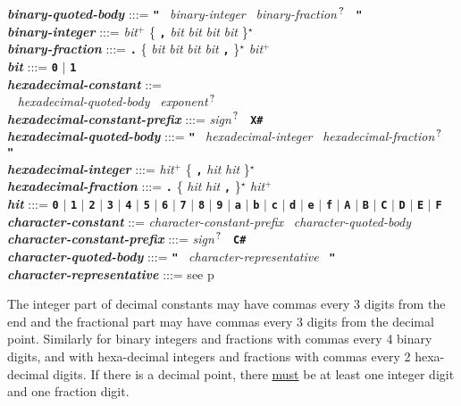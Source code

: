 \documentclass[12pt]{article}
\newcommand{\TT}[1]{{\tt \bfseries #1}}
\newcommand{\STAR}{{\Large $^\star$}}
\newcommand{\PLUS}[1][]{{$^{+#1}$}}
\newcommand{\QMARK}{{$^{\,\mbox{\footnotesize ?}}$}}
\newcommand{\emkey}[1]{{\em \bfseries #1}}
\newcommand{\pagref}[1]{p\pageref{#1}}
\newenvironment{indpar}[1][0.3in]%
	{\begin{list}{}%
		     {\setlength{\itemsep}{0in}%
		      \setlength{\topsep}{0in}%
		      \setlength{\parsep}{1ex}%
		      \setlength{\labelwidth}{#1}%
		      \setlength{\leftmargin}{#1}%
		      \addtolength{\leftmargin}{\labelsep}}%
	 \item}%
	{\end{list}}
\begin{document}
\begin{indpar}
\emkey{binary-quoted-body} :::= \TT{"}~ {\em binary-integer}~
				{\em binary-fraction}\QMARK{}~ \TT{"}
\\[0.5ex]
\emkey{binary-integer}
    :::= {\em bit}\PLUS{}
           \{ \TT{,} {\em bit} {\em bit} {\em bit} {\em bit} \}\STAR{} \\
\emkey{binary-fraction} :::=
    \TT{.} \{ {\em bit} {\em bit} {\em bit} {\em bit} \TT{,} \}\STAR{}
    {\em bit}\PLUS{} \\
\emkey{bit} :::= \TT{0} $|$ \TT{1}
 \\[0.5ex]
\emkey{hexadecimal-constant} ::= \\
\hspace*{0.5in}{\em hexadecimal-constant-prefix}~
               {\em hexadecimal-quoted-body}~
	       {\em exponent}\QMARK{}
\\[0.5ex]
\emkey{hexadecimal-constant-prefix} :::= {\em sign}\QMARK{}~ \TT{X\#}
\\[0.5ex]
\emkey{hexadecimal-quoted-body} :::= \TT{"}~ {\em hexadecimal-integer}~
				     {\em hexadecimal-fraction}\QMARK{}~ \TT{"}
\\[0.5ex]
\emkey{hexadecimal-integer}
    :::= {\em hit}\PLUS{}
           \{ \TT{,} {\em hit} {\em hit} \}\STAR{} \\
\emkey{hexadecimal-fraction} :::=
    \TT{.} \{ {\em hit} {\em hit} \TT{,} \}\STAR{}
    {\em hit}\PLUS{} \\
\emkey{hit} :::= \TT{0} $|$ \TT{1} $|$ \TT{2} $|$ \TT{3} $|$ \TT{4}
	     $|$ \TT{5} $|$ \TT{6} $|$ \TT{7} $|$ \TT{8} $|$ \TT{9}
	     $|$ \TT{a} $|$ \TT{b} $|$ \TT{c} $|$ \TT{d} $|$ \TT{e} $|$ \TT{f}
	     $|$ \TT{A} $|$ \TT{B} $|$ \TT{C} $|$ \TT{D} $|$ \TT{E} $|$ \TT{F}
 \\[0.5ex]
\emkey{character-constant} ::=
	{\em character-constant-prefix}~ {\em character-quoted-body}
\\[0.5ex]
\emkey{character-constant-prefix} :::= {\em sign}\QMARK{}~ \TT{C\#}
\\[0.5ex]
\emkey{character-quoted-body} :::=
	\TT{"}~ {\em character-representative}~ \TT{"}
\\[0.5ex]
\emkey{character-representative} :::= see \pagref{CHARACTER-REPRESENTATIVE}
\end{indpar}

The integer part of decimal constants may have commas
every 3 digits from the end and the fractional part may have
commas every 3 digits from the decimal point.
Similarly for binary integers and fractions with commas every 4 binary
digits,
and with hexa-decimal integers and fractions with commas every 2
hexa-decimal digits.
If there is a decimal point, there \underline{must}
be at least one integer digit and
one fraction digit.
\end{document}
